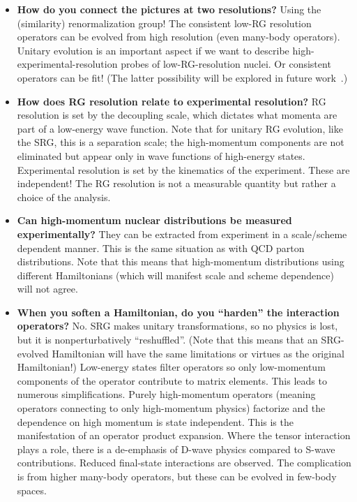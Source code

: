 \documentclass[10pt,aps,prc,floatfix,twocolumn,nofootinbib]{revtex4-1}
\begin{document}
\begin{itemize}
   
   \item\textbf{How do you connect the pictures at two resolutions?}
   Using the (similarity) renormalization group! The consistent low-RG resolution operators can be evolved from high resolution (even many-body operators).   Unitary evolution is an important aspect if we want to describe high-experimental-resolution probes of low-RG-resolution nuclei.
   Or consistent operators can be fit! (The latter possibility will be explored in future work~\cite{Tropiano:2021prep}.)

  \item\textbf{How does RG resolution relate to experimental resolution?}
  RG resolution is set by the decoupling scale, which dictates what momenta are part of a low-energy wave function. 
  Note that for unitary RG evolution, like the SRG, this is a separation scale; the high-momentum components are not eliminated but appear only in wave functions of high-energy states.
  Experimental resolution is set by the kinematics of the experiment. 
  These are independent!
  The RG resolution is not a measurable quantity but rather a choice of the analysis.
  
  \item\textbf{Can high-momentum nuclear distributions be measured experimentally?}
  They can be extracted from experiment in a scale/scheme dependent manner. This is the same situation as with QCD parton distributions.
  Note that this means that high-momentum distributions using different Hamiltonians (which will manifest scale and scheme dependence) will not agree.
 
  
  \item\textbf{When you soften a Hamiltonian, do you “harden” the interaction operators?}
  No. SRG makes unitary transformations, so no physics is lost, but it is nonperturbatively “reshuffled”.
  (Note that this means that an SRG-evolved Hamiltonian will have the same limitations or virtues as the original Hamiltonian!)
  Low-energy states filter operators so only low-momentum components of the operator contribute to matrix elements. 
  This leads to numerous simplifications.
  Purely high-momentum operators (meaning operators connecting to only high-momentum physics) factorize and the dependence on high momentum is state independent.
  This is the manifestation of an operator product expansion.
  Where the tensor interaction plays a role, there is a de-emphasis of D-wave physics compared to S-wave contributions.
  Reduced final-state interactions are observed.
  The complication is from higher many-body operators, but these can be evolved in few-body spaces.


\end{itemize}
\end{document}
